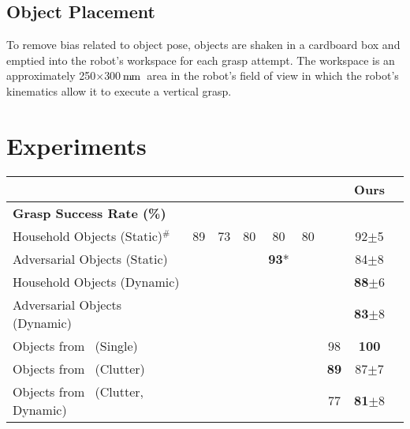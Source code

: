 \documentclass[conference]{IEEEtran}
\newcommand{\pack}	{\hspace{-0.08em}}
\newcommand{\mm}	{\ensuremath{\rm\,m\pack m}}
\begin{document}
\subsection{Object Placement}

To remove bias related to object pose, objects are shaken in a cardboard box and emptied into the robot's workspace for each grasp attempt.  The workspace is an approximately 250$\times$300\mm~area in the robot's field of view in which the robot's kinematics allow it to execute a vertical grasp.


\section{Experiments}

\begin{table*}[t!]
    \begin{center}
        \vspace{-3mm}
        \begin{tabular}{@{}lcccccccc@{}}
        \toprule
        & \cite{Lenz2015DeepGrasps} & \cite{Pinto2016SupersizingHours} & \cite{Johns2016DeepUncertainty} & \cite{Mahler2017Dex2} & \cite{Levine2017LearningCollection} & \cite{Viereck2017LearningImages} & \textbf{Ours} \\
        \midrule
        
        \textbf{Grasp Success Rate (\%)} \\                                    
        Household Objects (Static)$^\#$   & 89    & 73    & 80   & 80   & 80  &      & 92$\pm$5  \\
        Adversarial Objects (Static)      &       &       &      & \textbf{93}*& &   & 84$\pm$8 \\
        Household Objects (Dynamic)       &       &       &      &      &     &      & \textbf{88}$\pm$6 \\
        Adversarial Objects (Dynamic)     &       &       &      &      &     &      & \textbf{83}$\pm$8 \\
        Objects from~\cite{Viereck2017LearningImages} (Single)
                                          &       &       &      &      &     & 98   & \textbf{100} \\
        Objects from~\cite{Viereck2017LearningImages} (Clutter)
                                          &       &       &      &      &     & \textbf{89} & 87$\pm$7 \\
        Objects from~\cite{Viereck2017LearningImages} (Clutter, Dynamic)
                                          &       &       &      &      &     & 77   & \textbf{81}$\pm$8 \\
                                             

\end{tabular}
\end{center}
\end{table*}
\end{document}
